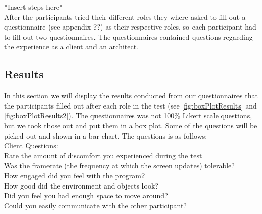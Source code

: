 *Insert steps here*\\

After the participants tried their different roles they where asked to fill out a questionnaire (see appendix ??) as their respective roles, so each participant had to fill out two questionnaires. The questionnaires contained questions regarding the experience as a client and an architect.

\subsection{Results}
In this section we will display the results conducted from our questionnaires that the participants filled out after each role in the test (see \autoref{fig:boxPlotResults} and \autoref{fig:boxPlotResults2}). The questionnaires was not 100\% Likert scale questions, but we took those out and put them in a box plot. Some of the questions will be picked out and shown in a bar chart.
The questions is as follows:\\

Client Questions:\\
Rate the amount of discomfort you experienced during the test\\
Was the framerate (the frequency at which the screen updates) tolerable?\\
How engaged did you feel with the program?\\
How good did the environment and objects look?\\
Did you feel you had enough space to move around?\\
Could you easily communicate with the other participant?\\


